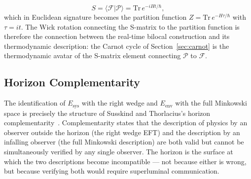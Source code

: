 \documentclass[12pt,a4paper]{article}
\begin{document}
\begin{equation}
S = \langle \mathcal{F} | \mathcal{P} \rangle 
  = \mathrm{Tr}\, e^{-iHt/\hbar},
\end{equation}
which in Euclidean signature becomes the partition 
function $Z = \mathrm{Tr}\, e^{-H\tau/\hbar}$ with 
$\tau = it$. The Wick rotation connecting the S-matrix 
to the partition function is therefore the connection 
between the real-time bilocal construction and its 
thermodynamic description: the Carnot cycle of 
Section~\ref{sec:carnot} is the thermodynamic avatar 
of the S-matrix element connecting $\mathcal{P}$ to 
$\mathcal{F}$.



\subsection{Horizon Complementarity}

The identification of $E_{\text{sys}}$ with the right 
wedge and $E_{\text{env}}$ with the full Minkowski space 
is precisely the structure of Susskind and Thorlacius's 
horizon complementarity~\cite{susskind1993stretched}. 
Complementarity states that the description of physics 
by an observer outside the horizon (the right wedge EFT) 
and the description by an infalling observer (the full 
Minkowski description) are both valid but cannot be 
simultaneously verified by any single observer. The 
horizon is the surface at which the two descriptions 
become incompatible --- not because either is wrong, 
but because verifying both would require superluminal 
communication.
\end{document}
